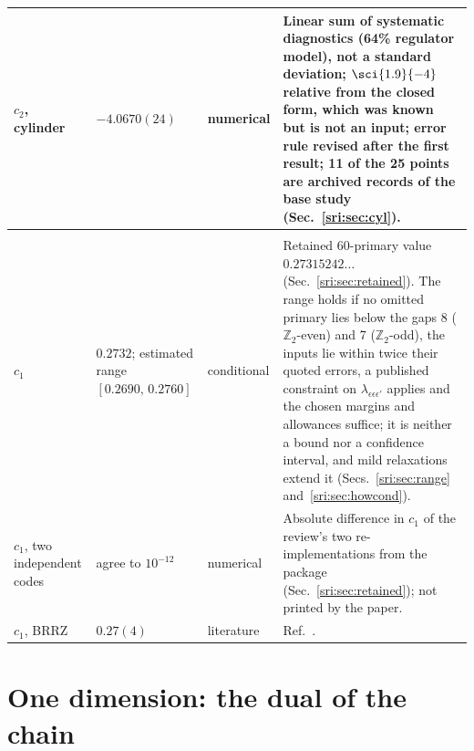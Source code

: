 {\begin{longtable}{@{}>{\raggedright\arraybackslash}p{}>{\raggedright\arraybackslash}p{}>{\raggedright\arraybackslash}p{}>{\raggedright\arraybackslash}p{}@{}}
$c_2$, cylinder & $-4.0670(24)$ & numerical & Linear sum of systematic diagnostics (64\% regulator model), not a standard deviation; $\sci{1.9}{-4}$ relative from the closed form, which was known but is not an input; error rule revised after the first result; 11 of the 25 points are archived records of the base study (Sec.~\ref{sri:sec:cyl}).\\
\midrule
\multicolumn{4}{@{}l}{$d=3$}\\
$c_1$ & $0.2732$; estimated range $[0.2690,\,0.2760]$ & conditional & Retained 60-primary value $0.27315242\ldots$ (Sec.~\ref{sri:sec:retained}). The range holds if no omitted primary lies below the gaps 8 ($\mathbb Z_2$-even) and 7 ($\mathbb Z_2$-odd), the inputs lie within twice their quoted errors, a published constraint on $\lambda_{\epsilon\epsilon\epsilon'}$ applies and the chosen margins and allowances suffice; it is neither a bound nor a confidence interval, and mild relaxations extend it (Secs.~\ref{sri:sec:range} and~\ref{sri:sec:howcond}).\\
$c_1$, two independent codes & agree to $10^{-12}$ & numerical & Absolute difference in $c_1$ of the review's two re-implementations from the package (Sec.~\ref{sri:sec:retained}); not printed by the paper.\\
$c_1$, BRRZ & $0.27(4)$ & literature & Ref.~\cite{sri:Behan:2017emf}.\\
\end{longtable}
}

\section{One dimension: the dual of the chain}\label{sri:sec:d1}
